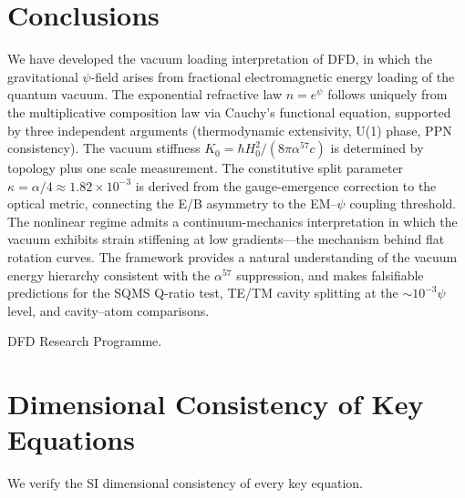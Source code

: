 \documentclass[aps,prd,twocolumn,superscriptaddress,nofootinbib]{revtex4-2}
\begin{document}
\section{Conclusions}
\label{sec:conclusions}

We have developed the vacuum loading interpretation of DFD, in which
the gravitational $\psi$-field arises from fractional electromagnetic
energy loading of the quantum vacuum.  The exponential refractive law
$n = e^\psi$ follows uniquely from the multiplicative composition law
via Cauchy's functional equation, supported by three independent
arguments (thermodynamic extensivity, U(1) phase, PPN consistency).
The vacuum stiffness $K_0 = \hbar H_0^2/(8\pi\alpha^{57}c)$ is
determined by topology plus one scale measurement.  The constitutive
split parameter $\kappa = \alpha/4 \approx 1.82 \times 10^{-3}$ is
derived from the gauge-emergence correction to the optical metric,
connecting the E/B asymmetry to the EM--$\psi$ coupling threshold.
The nonlinear regime admits a continuum-mechanics interpretation in
which the vacuum exhibits strain stiffening at low gradients---the
mechanism behind flat rotation curves.  The framework provides a
natural understanding of the vacuum energy hierarchy consistent with
the $\alpha^{57}$ suppression, and makes falsifiable predictions for
the SQMS Q-ratio test, TE/TM cavity splitting at the $\sim 10^{-3}\psi$
level, and cavity--atom comparisons.


\begin{acknowledgments}
DFD Research Programme.
\end{acknowledgments}


\appendix
\section{Dimensional Consistency of Key Equations}
\label{app:dimensions}

We verify the SI dimensional consistency of every key equation.
\end{document}
